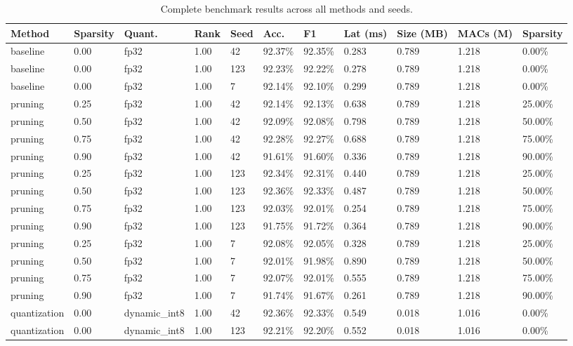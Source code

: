 \begin{table}[t]
\centering
\caption{Complete benchmark results across all methods and seeds.}
\label{tab:full_results}
\small
\setlength{\tabcolsep}{3pt}
\begin{tabular}{lllllllllll}
\toprule
Method & Sparsity & Quant. & Rank & Seed & Acc. & F1 & Lat (ms) & Size (MB) & MACs (M) & Sparsity \\
\midrule
baseline & 0.00 & fp32 & 1.00 & 42 & 92.37\% & 92.35\% & 0.283 & 0.789 & 1.218 & 0.00\% \\
baseline & 0.00 & fp32 & 1.00 & 123 & 92.23\% & 92.22\% & 0.278 & 0.789 & 1.218 & 0.00\% \\
baseline & 0.00 & fp32 & 1.00 & 7 & 92.14\% & 92.10\% & 0.299 & 0.789 & 1.218 & 0.00\% \\
pruning & 0.25 & fp32 & 1.00 & 42 & 92.14\% & 92.13\% & 0.638 & 0.789 & 1.218 & 25.00\% \\
pruning & 0.50 & fp32 & 1.00 & 42 & 92.09\% & 92.08\% & 0.798 & 0.789 & 1.218 & 50.00\% \\
pruning & 0.75 & fp32 & 1.00 & 42 & 92.28\% & 92.27\% & 0.688 & 0.789 & 1.218 & 75.00\% \\
pruning & 0.90 & fp32 & 1.00 & 42 & 91.61\% & 91.60\% & 0.336 & 0.789 & 1.218 & 90.00\% \\
pruning & 0.25 & fp32 & 1.00 & 123 & 92.34\% & 92.31\% & 0.440 & 0.789 & 1.218 & 25.00\% \\
pruning & 0.50 & fp32 & 1.00 & 123 & 92.36\% & 92.33\% & 0.487 & 0.789 & 1.218 & 50.00\% \\
pruning & 0.75 & fp32 & 1.00 & 123 & 92.03\% & 92.01\% & 0.254 & 0.789 & 1.218 & 75.00\% \\
pruning & 0.90 & fp32 & 1.00 & 123 & 91.75\% & 91.72\% & 0.364 & 0.789 & 1.218 & 90.00\% \\
pruning & 0.25 & fp32 & 1.00 & 7 & 92.08\% & 92.05\% & 0.328 & 0.789 & 1.218 & 25.00\% \\
pruning & 0.50 & fp32 & 1.00 & 7 & 92.01\% & 91.98\% & 0.890 & 0.789 & 1.218 & 50.00\% \\
pruning & 0.75 & fp32 & 1.00 & 7 & 92.07\% & 92.01\% & 0.555 & 0.789 & 1.218 & 75.00\% \\
pruning & 0.90 & fp32 & 1.00 & 7 & 91.74\% & 91.67\% & 0.261 & 0.789 & 1.218 & 90.00\% \\
quantization & 0.00 & dynamic\_int8 & 1.00 & 42 & 92.36\% & 92.33\% & 0.549 & 0.018 & 1.016 & 0.00\% \\
quantization & 0.00 & dynamic\_int8 & 1.00 & 123 & 92.21\% & 92.20\% & 0.552 & 0.018 & 1.016 & 0.00\% \\

\end{tabular}
\end{table}
